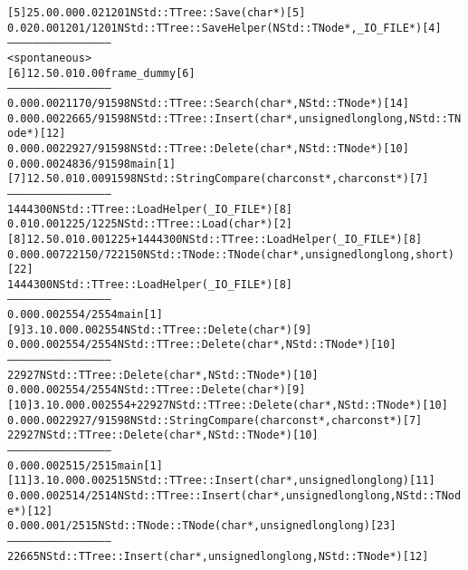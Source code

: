 \begin{alltt}
[5]     25.0    0.00    0.02    1201         NStd::TTree::Save(char*) [5]
                0.02    0.00    1201/1201        NStd::TTree::SaveHelper(NStd::TNode*, _IO_FILE*) [4]
-----------------------------------------------
                                                 <spontaneous>
[6]     12.5    0.01    0.00                 frame_dummy [6]
-----------------------------------------------
                0.00    0.00   21170/91598       NStd::TTree::Search(char*, NStd::TNode*) [14]
                0.00    0.00   22665/91598       NStd::TTree::Insert(char*, unsigned long long, NStd::TNode*) [12]
                0.00    0.00   22927/91598       NStd::TTree::Delete(char*, NStd::TNode*) [10]
                0.00    0.00   24836/91598       main [1]
[7]     12.5    0.01    0.00   91598         NStd::StringCompare(char const*, char const*) [7]
-----------------------------------------------
                             1444300             NStd::TTree::LoadHelper(_IO_FILE*) [8]
                0.01    0.00    1225/1225        NStd::TTree::Load(char*) [2]
[8]     12.5    0.01    0.00    1225+1444300 NStd::TTree::LoadHelper(_IO_FILE*) [8]
                0.00    0.00  722150/722150      NStd::TNode::TNode(char*, unsigned long long, short) [22]
                             1444300             NStd::TTree::LoadHelper(_IO_FILE*) [8]
-----------------------------------------------
                0.00    0.00    2554/2554        main [1]
[9]      3.1    0.00    0.00    2554         NStd::TTree::Delete(char*) [9]
                0.00    0.00    2554/2554        NStd::TTree::Delete(char*, NStd::TNode*) [10]
-----------------------------------------------
                               22927             NStd::TTree::Delete(char*, NStd::TNode*) [10]
                0.00    0.00    2554/2554        NStd::TTree::Delete(char*) [9]
[10]     3.1    0.00    0.00    2554+22927   NStd::TTree::Delete(char*, NStd::TNode*) [10]
                0.00    0.00   22927/91598       NStd::StringCompare(char const*, char const*) [7]
                               22927             NStd::TTree::Delete(char*, NStd::TNode*) [10]
-----------------------------------------------
                0.00    0.00    2515/2515        main [1]
[11]     3.1    0.00    0.00    2515         NStd::TTree::Insert(char*, unsigned long long) [11]
                0.00    0.00    2514/2514        NStd::TTree::Insert(char*, unsigned long long, NStd::TNode*) [12]
                0.00    0.00       1/2515        NStd::TNode::TNode(char*, unsigned long long) [23]
-----------------------------------------------
                               22665             NStd::TTree::Insert(char*, unsigned long long, NStd::TNode*) [12]

\end{alltt}
